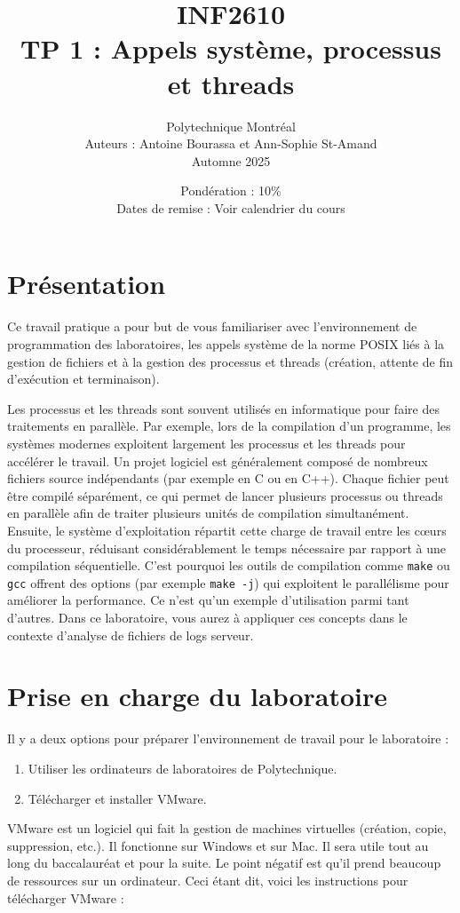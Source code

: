\documentclass[12pt,addpoints]{exam} %
\title{INF2610 \\ TP 1 : Appels système, processus et threads}
\author{Polytechnique Montréal \\ Auteurs : Antoine Bourassa et Ann-Sophie St-Amand \\ Automne 2025}
\date{Pondération : 10\% \\ Dates de remise : Voir calendrier du cours}
\begin{document}
\maketitle
\vspace{1cm}


\section*{Présentation}
Ce travail pratique a pour but de vous familiariser avec l’environnement de programmation des laboratoires, les appels système de la norme POSIX liés à la gestion de fichiers et à la gestion des processus et threads (création, attente de fin d’exécution et terminaison).


Les processus et les threads sont souvent utilisés en informatique pour faire des traitements en parallèle. Par exemple, lors de la compilation d’un programme, les systèmes modernes exploitent largement les processus et les threads pour accélérer le travail. Un projet logiciel est généralement composé de nombreux fichiers source indépendants (par exemple en C ou en C++). Chaque fichier peut être compilé séparément, ce qui permet de lancer plusieurs processus ou threads en parallèle afin de traiter plusieurs unités de compilation simultanément. Ensuite, le système d’exploitation répartit cette charge de travail entre les cœurs du processeur, réduisant considérablement le temps nécessaire par rapport à une compilation séquentielle. C’est pourquoi les outils de compilation comme \texttt{make} ou \texttt{gcc} offrent des options (par exemple \texttt{make -j}) qui exploitent le parallélisme pour améliorer la performance. Ce n’est qu’un exemple d’utilisation parmi tant d’autres. Dans ce laboratoire, vous aurez à appliquer ces concepts dans le contexte d’analyse de fichiers de logs serveur.


\section*{Prise en charge du laboratoire}
Il y a deux options pour préparer l’environnement de travail pour le laboratoire :
\begin{enumerate}
\item Utiliser les ordinateurs de laboratoires de Polytechnique.
\item Télécharger et installer VMware.
\end{enumerate}

\vspace{0.5cm}
VMware est un logiciel qui fait la gestion de machines virtuelles (création, copie, suppression, etc.). Il fonctionne sur Windows et sur Mac. Il sera utile tout au long du baccalauréat et pour la suite. Le point négatif est qu’il prend beaucoup de ressources sur un ordinateur. Ceci étant dit, voici les instructions pour télécharger VMware :
\end{document}
